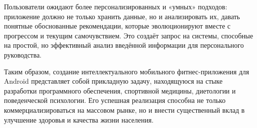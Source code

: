 Пользователи ожидают более персонализированных и «умных» подходов: приложение должно не только хранить данные, но и анализировать их, давать понятные обоснованные рекомендации, которые эволюционируют вместе с прогрессом и текущим самочувствием. Это создаёт запрос на системы, способные на простой, но эффективный анализ введённой информации для персонального руководства.

Таким образом, создание интеллектуального мобильного фитнес-приложения для Android представляет собой прикладную задачу, находящуюся на стыке разработки программного обеспечения, спортивной медицины, диетологии и поведенческой психологии. Его успешная реализация способна не только коммерциализироваться на массовом рынке, но и внести существенный вклад в улучшение здоровья и качества жизни населения.